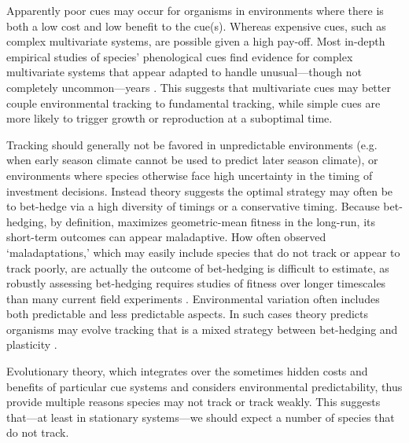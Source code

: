 \documentclass[11pt,letterpaper]{article}
\newcommand{\R}[1]{\label{}\linelabel{#1}} %
\begin{document}
Apparently poor cues may occur for organisms in environments where there is both a low cost and low benefit to the cue(s). Whereas expensive cues, such as complex multivariate systems, are possible given a high pay-off. Most in-depth empirical\R{sayempricial} studies of species' phenological cues find evidence for complex multivariate systems that appear adapted to handle unusual---though not completely uncommon---years \citep{chuinearees}.  This suggests that multivariate cues may better couple environmental tracking to fundamental tracking, while simple cues are more likely to trigger growth or reproduction at a suboptimal time.\R{plasE}

\R{bhS}Tracking should generally not be favored in unpredictable environments (e.g. when early season climate cannot be used to predict later season climate), or environments where species otherwise face high uncertainty in the timing of investment decisions. Instead theory suggests the optimal strategy may often be to bet-hedge \citep{Venable:2007os,donald2013,decasas2015}\R{r1ass4} via a high diversity of timings or a conservative timing. Because bet-hedging, by definition, maximizes geometric-mean fitness in the long-run, its short-term outcomes can appear maladaptive. How often observed `maladaptations,' which may easily include species that do not track or appear to track poorly, are actually the outcome of bet-hedging is difficult to estimate, as robustly assessing bet-hedging requires studies of fitness over longer timescales than many current field experiments \citep{simons2011}.\R{simonsref1} Environmental variation often includes both predictable and less predictable aspects. In such cases theory predicts organisms may evolve tracking that is a mixed strategy between bet-hedging and plasticity \citep{wong2005}.\R{bhE} 

Evolutionary theory, which integrates over the sometimes hidden costs and benefits of particular cue systems and considers environmental predictability, thus provide multiple reasons species may not track or track weakly. This suggests that---at least in stationary systems---we should expect a number of species that do not track.\\
\end{document}
